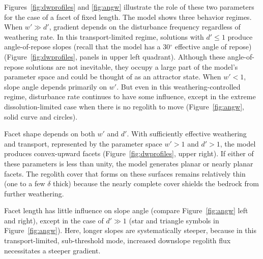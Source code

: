 Figures~\ref{fig:dwprofiles} and \ref{fig:angw} illustrate the role of these two parameters for the case of a facet of fixed length. The model shows three behavior regimes. When $w'\gg d'$, gradient depends on the disturbance frequency regardless of weathering rate. In this transport-limited regime, solutions with $d'\le 1$ produce angle-of-repose slopes (recall that the model has a 30$^\circ$ effective angle of repose) (Figure~\ref{fig:dwprofiles}, panels in upper left quadrant). Although these angle-of-repose solutions are not inevitable, they occupy a large part of the model's parameter space and could be thought of as an attractor state. When $w' < 1$, slope angle depends primarily on $w'$. But even in this weathering-controlled regime, disturbance rate continues to have some influence, except in the extreme dissolution-limited case when there is no regolith to move (Figure~\ref{fig:angw}, solid curve and circles). 

Facet shape depends on both $w'$ and $d'$. With sufficiently effective weathering and transport, represented by the parameter space $w'>1$ and $d'>1$, the model produces convex-upward facets (Figure~\ref{fig:dwprofiles}, upper right). If either of these parameters is less than unity, the model generates planar or nearly planar facets. The regolith cover that forms on these surfaces remains relatively thin (one to a few $\delta$ thick) because the nearly complete cover shields the bedrock from further weathering.

Facet length has little influence on slope angle (compare Figure~\ref{fig:angw} left and right), except in the case of $d'\gg 1$ (star and triangle symbols in Figure~\ref{fig:angw}). Here, longer slopes are systematically steeper, because in this transport-limited, sub-threshold mode, increased downslope regolith flux necessitates a steeper gradient.

